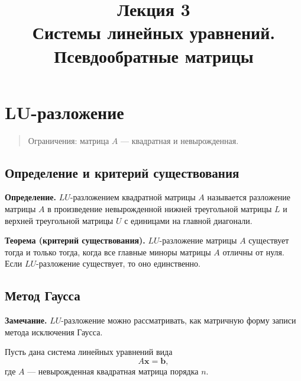 \documentclass[11pt,a4paper]{article}
\title{
  {\Large Лекция 3} \\
  Системы линейных уравнений. \\
  Псевдообратные матрицы
}
\date{}
\begin{document}
  \maketitle
  \thispagestyle{empty}
  \tableofcontents
  \newpage


\hypertarget{mathbflu-ux440ux430ux437ux43bux43eux436ux435ux43dux438ux435}{%
\section{\texorpdfstring{\(\mathbf{LU}\)-разложение}{LU-разложение}}\label{mathbflu-ux440ux430ux437ux43bux43eux436ux435ux43dux438ux435}}

\begin{quote}
  Ограничения: матрица \(A\) --- квадратная и невырожденная.
\end{quote}

\hypertarget{ux43eux43fux440ux435ux434ux435ux43bux435ux43dux438ux435-ux438-ux43aux440ux438ux442ux435ux440ux438ux439-ux441ux443ux449ux435ux441ux442ux432ux43eux432ux430ux43dux438ux44f}{%
\subsection{Определение и критерий
существования}\label{ux43eux43fux440ux435ux434ux435ux43bux435ux43dux438ux435-ux438-ux43aux440ux438ux442ux435ux440ux438ux439-ux441ux443ux449ux435ux441ux442ux432ux43eux432ux430ux43dux438ux44f}}

\textbf{Определение.} \(LU\)-разложением квадратной матрицы \(A\)
называется разложение матрицы \(A\) в произведение невырожденной нижней
треугольной матрицы \(L\) и верхней треугольной матрицы \(U\) с
единицами на главной диагонали.

\textbf{Теорема (критерий существования).} \(LU\)-разложение матрицы
\(A\) существует тогда и только тогда, когда все главные миноры матрицы
\(A\) отличны от нуля. Если \(LU\)-разложение существует, то оно
единственно.

    \hypertarget{ux43cux435ux442ux43eux434-ux433ux430ux443ux441ux441ux430}{%
\subsection{Метод
Гаусса}\label{ux43cux435ux442ux43eux434-ux433ux430ux443ux441ux441ux430}}

\textbf{Замечание.} \(LU\)-разложение можно рассматривать, как матричную
форму записи метода исключения Гаусса.

Пусть дана система линейных уравнений вида
\[ A \mathbf{x} = \mathbf{b}, \] где \(A\) --- невырожденная квадратная
матрица порядка \(n\).
\end{document}
